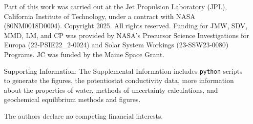 \documentclass[journal=aesccq,manuscript=article]{achemso}
\begin{document}
\begin{acknowledgement}



Part of this work was carried out at the Jet Propulsion Laboratory (JPL), California Institute of Technology, under a contract with NASA (80NM0018D0004). Copyright 2025. All rights reserved.
Funding for JMW, SDV, MMD, LM, and CP was provided by NASA’s Precursor Science Investigations for Europa (22-PSIE22\_2-0024) and Solar System Workings (23-SSW23-0080) Programs. 
JC was funded by the Maine Space Grant.

\end{acknowledgement}

Supporting Information: The Supplemental Information includes \texttt{python} scripts to generate the figures, the potentiostat conductivity data, more information about the properties of water, methods of uncertainty calculations, and geochemical equilibrium methods and figures. 

The authors declare no competing financial interests.



\end{document}
